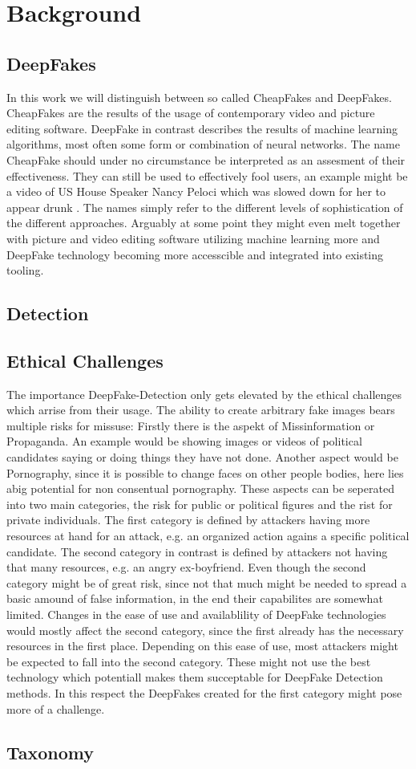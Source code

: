 \section{Background}
\subsection{DeepFakes}
In this work we will distinguish between so called CheapFakes and DeepFakes.
CheapFakes are the results of the usage of contemporary video and picture editing software.
DeepFake in contrast describes the results of machine learning algorithms, most 
often some form or combination of neural networks.
The name CheapFake should under no circumstance be interpreted as an assesment of
their effectiveness.
They can still be used to effectively fool users, an example might be a video
of US House Speaker Nancy Peloci which was slowed down for her to appear drunk .
The names simply refer to the different levels of sophistication of the different approaches.
Arguably at some point they might even melt together with picture and video editing software
utilizing machine learning more and DeepFake technology becoming more accesscible and integrated
into existing tooling.
\subsection{Detection}
\subsection{Ethical Challenges}
The importance DeepFake-Detection only gets elevated by the ethical challenges which arrise
from their usage.
The ability to create arbitrary fake images bears multiple risks for missuse:
Firstly there is the aspekt of Missinformation or Propaganda. 
An example would be showing images or videos of political candidates saying or doing things they have not done.
Another aspect would be Pornography, since it is possible to change faces on other people bodies, here lies abig potential for non consentual pornography.
These aspects can be seperated into two main categories, the risk for public or political figures and the rist for private individuals.
The first category is defined by attackers having more resources at hand for an attack, e.g. an organized action agains a specific political candidate.
The second category in contrast is defined by attackers not having that many resources, e.g. an angry ex-boyfriend.
Even though the second category might be of great risk, since not that much might be needed to spread
a basic amound of false information, in the end their capabilites are somewhat limited.
Changes in the ease of use and availablility of DeepFake technologies would mostly affect the second category,
since the first already has the necessary resources in the first place.
Depending on this ease of use, most attackers might be expected to fall into the second category.
These might not use the best technology which potentiall makes them succeptable for DeepFake Detection methods.
In this respect the DeepFakes created for the first category might pose more of a challenge.
 
\subsection{Taxonomy}
